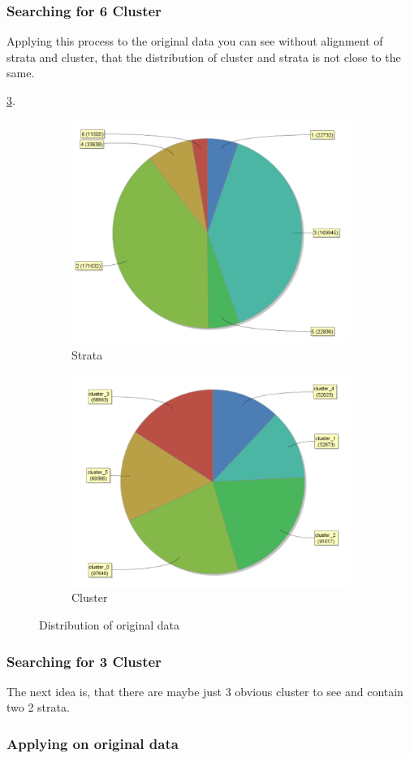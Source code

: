 \subsubsection{Searching for 6 Cluster}
Applying this process to the original data you can see without alignment of strata and cluster, that the distribution of cluster and strata is not close to the same.

\ref{fig:OrgDist}. 
\begin{figure}
\centering
\begin{subfigure}{.5\textwidth}
  \centering
  \includegraphics[width=.4\linewidth]{../Miriam-RapidMiner/ClusterPCAOrigRapidStrata.PNG}
  \caption{Strata}
  \label{fig:OrgSt}
\end{subfigure}%
\begin{subfigure}{.5\textwidth}
  \centering
  \includegraphics[width=.4\linewidth]{../Miriam-RapidMiner/ClusterPCAOrigRapidCluster.PNG}
  \caption{Cluster}
  \label{fig:OrgCl}
\end{subfigure}
\caption{Distribution of original data}
\label{fig:OrgDist}
\end{figure}

\subsubsection{Searching for 3 Cluster}

The next idea is, that there are maybe just 3 obvious cluster to see and contain two 2 strata.

\subsubsection{Applying on original data}


